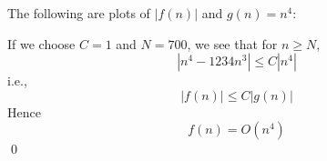 The following are plots of $|f(n)|$ and $g(n) = n^4$:


If we choose $C = 1$ and $N = 700$,
we see that for $n \geq N$,
\[
\left|
n^{4} - 1234n^3
\right| 
\leq C
\left|
n^4
\right|
\]
i.e.,
\[
|f(n)| \leq C|g(n)|
\]
Hence
\[
f(n) = O(n^4)
\]
\qed
